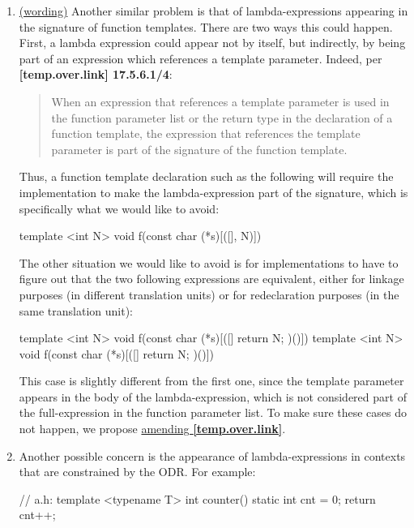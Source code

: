 \documentclass{wg21}
\begin{document}
\begin{enumerate}
  \item \label{discussion.template}
    \hyperref[wording.template]{(wording)}
    Another similar problem is that of lambda-expressions appearing in the
    signature of function templates. There are two ways this could happen.
    First, a lambda expression could appear not by itself, but indirectly, by
    being part of an expression which references a template parameter. Indeed,
    per \textbf{[temp.over.link] 17.5.6.1/4}:
    \begin{quote}
      When an expression that references a template parameter is used in the
      function parameter list or the return type in the declaration of a function
      template, the expression that references the template parameter is part of
      the signature of the function template.
    \end{quote}

    Thus, a function template declaration such as the following will require the
    implementation to make the lambda-expression part of the signature, which is
    specifically what we would like to avoid:
\begin{cpp}
template <int N>
void f(const char (*s)[([]{}, N)]) { }
\end{cpp}

    The other situation we would like to avoid is for implementations to have
    to figure out that the two following expressions are equivalent, either
    for linkage purposes (in different translation units) or for redeclaration
    purposes (in the same translation unit):
\begin{cpp}
template <int N> void f(const char (*s)[([]{ return N; })()]) { }
template <int N> void f(const char (*s)[([]{ return N; })()]) { }
\end{cpp}

    This case is slightly different from the first one, since the template
    parameter appears in the body of the lambda-expression, which is not
    considered part of the full-expression in the function parameter list.
    To make sure these cases do not happen, we propose
    \hyperref[wording.template]{amending \textbf{[temp.over.link]}}.


  \item \label{discussion.ODR}
    Another possible concern is the appearance of lambda-expressions in
    contexts that are constrained by the ODR. For example:

\begin{cpp}
// a.h:
template <typename T>
int counter() {
  static int cnt = 0;
  return cnt++;
}


\end{cpp}
\end{enumerate}
\end{document}
